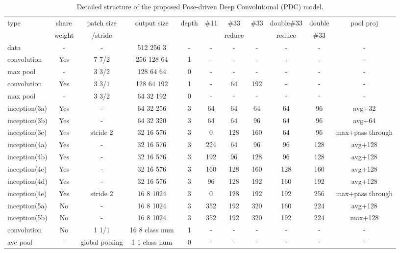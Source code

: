 \documentclass[10pt,twocolumn,letterpaper]{article}
\begin{document}
\begin{table*}[htbp]
\footnotesize
\tabcolsep=5pt
\caption{Detailed structure of the proposed Pose-driven Deep Convolutional (PDC) model.}
  \centering
    \begin{tabular}{l|c|c|c|c|c|c|c|c|c|c}
    \hline \multirow{2}{*}{type}&share& {patch size} & \multirow{2}{*}{output size} & \multirow{2}{*}{depth} & \multirow{2}{*}{\#11} & {\#33} & \multirow{2}{*}{\#33} & {double\#33} & {double} & \multirow{2}{*}{pool proj} \\
    &weight&/stride&&&&reduce&&reduce&\#33&\\
    \hline\hline {data} &-& {-} & {512 256 3} & {-} & {-} & {-} & {-} & {-} & {-} & {-} \\
    \hline {convolution} &Yes& {7 7/2} & {256 128 64} & {1} & {-} & {-} & {-} & {-} & {-} & {-} \\
    \hline {max pool} &-& {3 3/2} & {128 64 64} & {0} & {-} & {-} & {-} & {-} & {-} & {-} \\
    \hline {convolution} &Yes& {3 3/1} & {128 64 192} & {1} & {-} & {64} & {192} & {-} & {-} & {-} \\
    \hline {max pool} &-& {3 3/2} & {64 32 192} & {0} & {-} & {-} & {-} & {-} & {-} & {-} \\
    \hline {inception(3a)} &Yes&{-} & {64 32 256} & {3} & {64} & {64} & {64} & {64} & {96} & {avg+32} \\
    \hline {inception(3b)} &Yes&{-} & {64 32 320} & {3} & {64} & {64} & {96} & {64} & {96} & {avg+64} \\
    \hline {inception(3c)} &Yes&{stride 2} & {32 16 576} & {3} & {0} & {128} & {160} & {64} & {96} & {max+pass through} \\
    \hline {inception(4a)} &Yes&{-} & {32 16 576} & {3} & {224} & {64} & {96} & {96} & {128} & {avg+128} \\
    \hline {inception(4b)} &Yes&{-} & {32 16 576} & {3} & {192} & {96} & {128} & {96} & {128} & {avg+128} \\
    \hline {inception(4c)} &Yes&{-} & {32 16 576} & {3} & {160} & {128} & {160} & {128} & {160} & {avg+128} \\
    \hline {inception(4d)} &Yes&{-} & {32 16 576} & {3} & {96} & {128} & {192} & {160} & {192} & {avg+128} \\
    \hline {inception(4e)} &Yes&{stride 2} & {16 8 1024} & {3} & {0} & {128} & {192} & {192} & {256} & {max+pass through} \\
    \hline {inception(5a)} &No&{-} & {16 8 1024} & {3} & {352} & {192} & {320} & {160} & {224} & {avg+128} \\
    \hline {inception(5b)} &No&{-} & {16 8 1024} & {3} & {352} & {192} & {320} & {192} & {224} & {max+128} \\
    \hline {convolution} &No&{1 1/1} & {16 8 class num} & {1} & {-} & {-} & {-} & {-} & {-} & {-} \\
    \hline {ave pool} &-&{global pooling} & {1 1 class num} & {0} & {-} & {-} & {-} & {-} & {-} & {-} \\
    \hline
    \end{tabular}\vspace{-4mm}
  \label{table:baseline}\end{table*}
\end{document}
